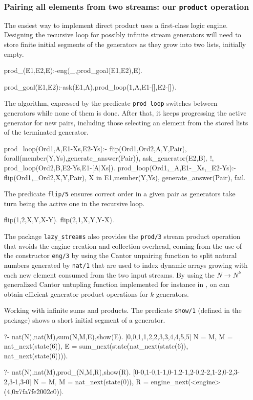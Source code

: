 \documentclass{new_tlp}
\begin{document}
\subsubsection{Pairing all elements from two streams: our {\tt product} operation}

The easiest way to implement direct product uses a first-class logic engine.
Designing the recursive loop for possibly infinite stream generators
will need to store finite initial 
segments of the generators as they grow into two lists, initially
empty.
\begin{code}
prod_(E1,E2,E):-eng(_,prod_goal(E1,E2),E).

prod_goal(E1,E2):-ask(E1,A),prod_loop(1,A,E1-[],E2-[]).
\end{code}

The algorithm, expressed by the predicate {\tt prod\_loop}
switches between generators while none of them is done.
After that, it keeps progressing the active generator 
for new pairs, including those selecting an element 
from the stored lists of the terminated generator.
\begin{code}
prod_loop(Ord1,A,E1-Xs,E2-Ys):-
  flip(Ord1,Ord2,A,Y,Pair),
  forall(member(Y,Ys),generate_answer(Pair)),
  ask_generator(E2,B),
  !,
  prod_loop(Ord2,B,E2-Ys,E1-[A|Xs]).
prod_loop(Ord1,_A,E1-_Xs,_E2-Ys):-
  flip(Ord1,_Ord2,X,Y,Pair),
  X in E1,member(Y,Ys),
  generate_answer(Pair),
  fail.
\end{code}

The predicate {\tt flip/5} ensures correct order in a given pair
as  generators take turn being the active one in the recursive loop. 
\begin{code} 
flip(1,2,X,Y,X-Y).
flip(2,1,X,Y,Y-X).
\end{code}

The package {\tt lazy\_streams} also provides the {\tt prod/3} stream product 
operation that avoids the engine creation and collection overhead,
coming from the use of the constructor {\tt eng/3} by using the Cantor
unpairing function  to split natural numbers generated by {\tt nat/1}
that are used to index dynamic arrays growing with each new element consumed
from the two input streams. By using the  $N \rightarrow N^k$ generalized Cantor
 untupling function implemented for instance in \cite{serpro}, on can obtain efficient
 generator  product operations for $k$ generators.


\BX
Working with infinite sums and products. The  predicate {\tt show/1} (defined in the package) shows a short initial segment of a generator.
\begin{codex}
?- nat(N),nat(M),sum(N,M,E),show(E).
[0,0,1,1,2,2,3,3,4,4,5,5]
N = M, M = nat_next(state(6)),
E = sum_next(state(nat_next(state(6)), nat_next(state(6)))).

?- nat(N),nat(M),prod_(N,M,R),show(R).
[0-0,1-0,1-1,0-1,2-1,2-0,2-2,1-2,0-2,3-2,3-1,3-0]
N = M, M = nat_next(state(0)),
R = engine_next(<engine>(4,0x7fa7fe2002c0)).
\end{codex}
\EX
\end{document}
